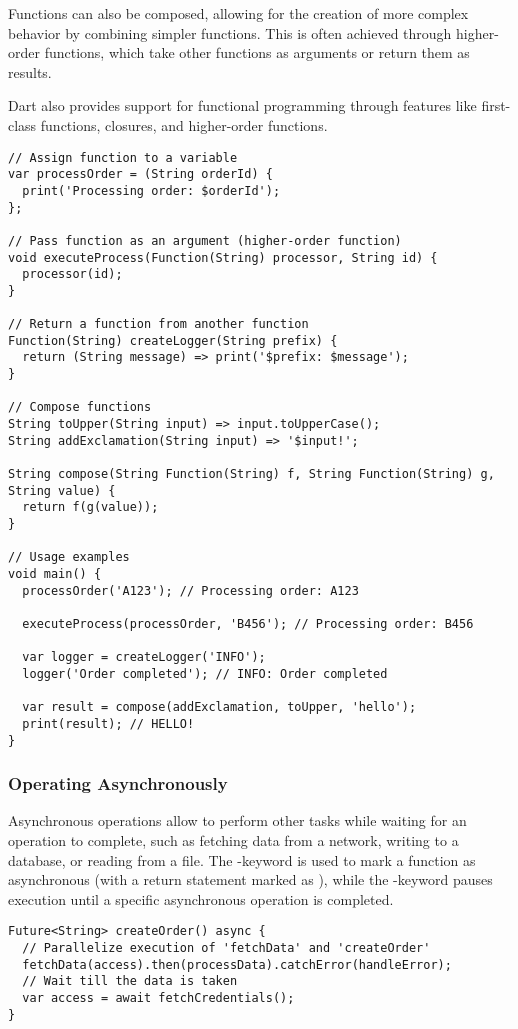 Functions can also be composed, allowing for the creation of more complex behavior by combining simpler functions.
This is often achieved through higher-order functions, which take other functions as arguments or return them as results.

Dart also provides support for functional programming through features like first-class functions, closures,
and higher-order functions.

\begin{lstlisting}
// Assign function to a variable
var processOrder = (String orderId) {
  print('Processing order: $orderId');
};

// Pass function as an argument (higher-order function)
void executeProcess(Function(String) processor, String id) {
  processor(id);
}

// Return a function from another function
Function(String) createLogger(String prefix) {
  return (String message) => print('$prefix: $message');
}

// Compose functions
String toUpper(String input) => input.toUpperCase();
String addExclamation(String input) => '$input!';

String compose(String Function(String) f, String Function(String) g, String value) {
  return f(g(value));
}

// Usage examples
void main() {
  processOrder('A123'); // Processing order: A123

  executeProcess(processOrder, 'B456'); // Processing order: B456

  var logger = createLogger('INFO');
  logger('Order completed'); // INFO: Order completed

  var result = compose(addExclamation, toUpper, 'hello');
  print(result); // HELLO!
}
\end{lstlisting}


\subsubsection{Operating Asynchronously}

Asynchronous operations allow to perform other tasks while waiting for an operation to complete, such as fetching data
from a network, writing to a database, or reading from a file. The -keyword is used to mark a function as
asynchronous (with a return statement marked as ), while the -keyword pauses execution until a
specific asynchronous operation is completed.

\begin{lstlisting}
Future<String> createOrder() async {
  // Parallelize execution of 'fetchData' and 'createOrder'
  fetchData(access).then(processData).catchError(handleError);
  // Wait till the data is taken
  var access = await fetchCredentials();
}
\end{lstlisting}

